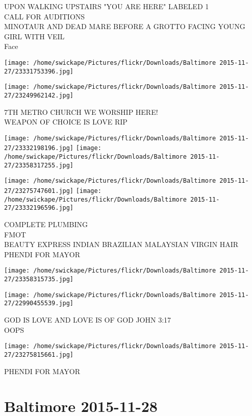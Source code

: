 \documentclass[10pt,letterpaper]{article}
\begin{document}
UPON WALKING UPSTAIRS "YOU ARE HERE" LABELED 1\\
CALL FOR AUDITIONS\\
MINOTAUR AND DEAD MARE BEFORE A GROTTO FACING YOUNG GIRL WITH VEIL\\
Face
\pagebreak

\texttt{[image: /home/swickape/Pictures/flickr/Downloads/Baltimore 2015-11-27/23331753396.jpg]}

\vspace{0.25in}
\texttt{[image: /home/swickape/Pictures/flickr/Downloads/Baltimore 2015-11-27/23249962142.jpg]}

7TH METRO CHURCH WE WORSHIP HERE!\\
WEAPON OF CHOICE IS LOVE RIP
\pagebreak

\texttt{[image: /home/swickape/Pictures/flickr/Downloads/Baltimore 2015-11-27/23332198196.jpg]}
\texttt{[image: /home/swickape/Pictures/flickr/Downloads/Baltimore 2015-11-27/23358317255.jpg]}

\texttt{[image: /home/swickape/Pictures/flickr/Downloads/Baltimore 2015-11-27/23275747601.jpg]}
\texttt{[image: /home/swickape/Pictures/flickr/Downloads/Baltimore 2015-11-27/23332196596.jpg]}

COMPLETE PLUMBING\\
FMOT\\
BEAUTY EXPRESS INDIAN BRAZILIAN MALAYSIAN VIRGIN HAIR\\
PHENDI FOR MAYOR
\pagebreak

\texttt{[image: /home/swickape/Pictures/flickr/Downloads/Baltimore 2015-11-27/23358315735.jpg]}

\vspace{0.25in}
\texttt{[image: /home/swickape/Pictures/flickr/Downloads/Baltimore 2015-11-27/22990455539.jpg]}

GOD IS LOVE AND LOVE IS OF GOD JOHN 3:17\\
OOPS
\pagebreak

\texttt{[image: /home/swickape/Pictures/flickr/Downloads/Baltimore 2015-11-27/23275815661.jpg]}

PHENDI FOR MAYOR
\pagebreak

\section*{Baltimore 2015-11-28}
\end{document}
